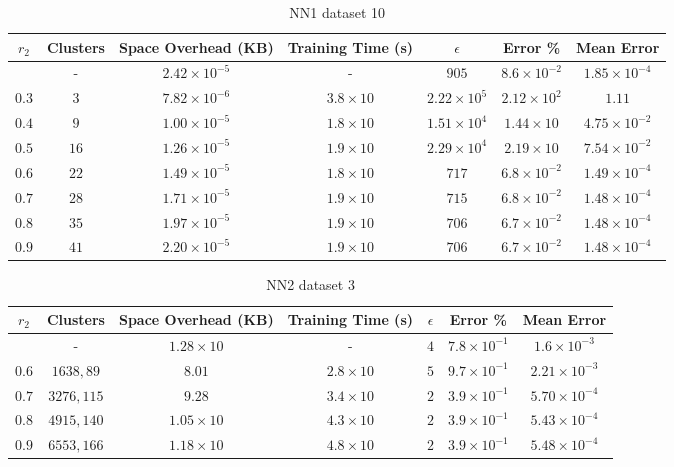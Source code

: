 \begin{adjustwidth}{-1cm}{}
\begin{table}
\caption{NN1 dataset 10}\label{ws110}
\begin{tabular}{ccccccc}
\hline
\toprule
$r_2$ & Clusters & Space Overhead (KB) & Training Time (s) & $\epsilon$ & Error \% & Mean Error\\
\midrule
& - & $2.42 \times 10^{-5}$ & - & $905$ & $8.6 \times 10^{-2}$ & $1.85 \times 10^{-4}$\\
$0.3$ & $3$ & $7.82 \times 10^{-6}$ & $3.8 \times 10$ & $2.22 \times 10^5$ & $2.12 \times 10^2$ & $1.11$\\
$0.4$ & $9$ & $1.00 \times 10^{-5}$ & $1.8 \times 10$ & $1.51 \times 10^4$ & $1.44 \times 10$ & $4.75 \times 10^{-2}$\\
$0.5$ & $16$ & $1.26 \times 10^{-5}$ & $1.9 \times 10$ & $2.29 \times 10^4$ & $2.19 \times 10$ & $7.54 \times 10^{-2}$\\
$0.6$ & $22$ & $1.49 \times 10^{-5}$ & $1.8 \times 10$ & $717$ & $6.8 \times 10^{-2}$ & $1.49 \times 10^{-4}$\\
$0.7$ & $28$ & $1.71 \times 10^{-5}$ & $1.9 \times 10$ & $715$ & $6.8 \times 10^{-2}$ & $1.48 \times 10^{-4}$\\
$0.8$ & $35$ & $1.97 \times 10^{-5}$ & $1.9 \times 10$ & $706$ & $6.7 \times 10^{-2}$ & $1.48 \times 10^{-4}$\\
$0.9$ & $41$ & $2.20 \times 10^{-5}$ & $1.9 \times 10$ & $706$ & $6.7 \times 10^{-2}$ & $1.48 \times 10^{-4}$\\
\bottomrule
\end{tabular}
\end{table}
\end{adjustwidth}

\begin{adjustwidth}{-1cm}{}
\begin{table}
\caption{NN2 dataset 3}\label{ws23}
\begin{tabular}{ccccccc}
\hline
\toprule
$r_2$ & Clusters & Space Overhead (KB) & Training Time (s) & $\epsilon$ & Error \% & Mean Error\\
\midrule
& - & $1.28 \times 10$ & - & $4$ & $7.8 \times 10^{-1}$ & $1.6 \times 10^{-3}$\\
$0.6$ & $1638, 89$ & $8.01$ & $2.8 \times 10$ & $5$ & $9.7 \times 10^{-1}$ & $2.21 \times 10^{-3}$\\
$0.7$ & $3276, 115$ & $9.28$ & $3.4 \times 10$ & $2$ & $3.9 \times 10^{-1}$ & $5.70 \times 10^{-4}$\\
$0.8$ & $4915, 140$ & $1.05 \times 10$ & $4.3 \times 10$ & $2$ & $3.9 \times 10^{-1}$ & $5.43 \times 10^{-4}$\\
$0.9$ & $6553, 166$ & $1.18 \times 10$ & $4.8 \times 10$ & $2$ & $3.9 \times 10^{-1}$ & $5.48 \times 10^{-4}$\\
\bottomrule
\end{tabular}
\end{table}
\end{adjustwidth}

